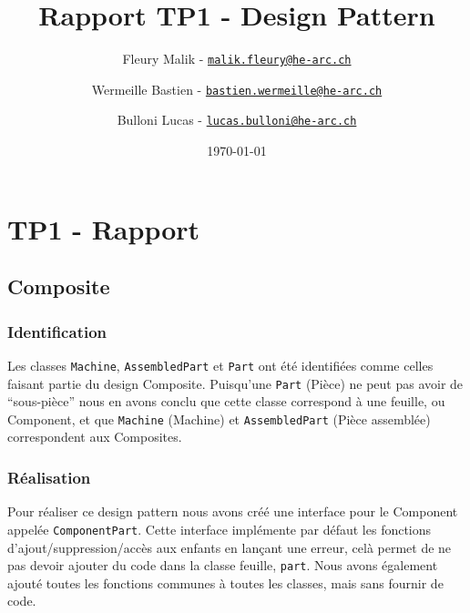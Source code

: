 \documentclass[french,]{article}
\title{Rapport TP1 - Design Pattern}
\author{Fleury Malik -
\href{mailto:malik.fleury@he-arc.ch}{\nolinkurl{malik.fleury@he-arc.ch}} \and Wermeille Bastien -
\href{mailto:bastien.wermeille@he-arc.ch}{\nolinkurl{bastien.wermeille@he-arc.ch}} \and Bulloni Lucas -
\href{mailto:lucas.bulloni@he-arc.ch}{\nolinkurl{lucas.bulloni@he-arc.ch}}}
\date{\today}
\begin{document}
\maketitle

{
\setcounter{tocdepth}{5}
\tableofcontents
}
\newpage
\section{TP1 - Rapport}\label{tp1---rapport}

\subsection{Composite}\label{composite}

\subsubsection{Identification}\label{identification}

Les classes \texttt{Machine}, \texttt{AssembledPart} et \texttt{Part}
ont été identifiées comme celles faisant partie du design Composite.
Puisqu'une \texttt{Part} (Pièce) ne peut pas avoir de ``sous-pièce''
nous en avons conclu que cette classe correspond à une feuille, ou
Component, et que \texttt{Machine} (Machine) et \texttt{AssembledPart}
(Pièce assemblée) correspondent aux Composites.

\subsubsection{Réalisation}\label{ruxe9alisation}

Pour réaliser ce design pattern nous avons créé une interface pour le
Component appelée \texttt{ComponentPart}. Cette interface implémente par
défaut les fonctions d'ajout/suppression/accès aux enfants en lançant
une erreur, celà permet de ne pas devoir ajouter du code dans la classe
feuille, \texttt{part}. Nous avons également ajouté toutes les fonctions
communes à toutes les classes, mais sans fournir de code.
\end{document}
